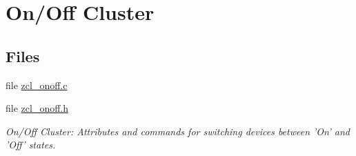 \hypertarget{group__zcl__onoff}{\section{On/\-Off Cluster}
\label{group__zcl__onoff}
}
\subsection*{Files}
\begin{DoxyCompactItemize}
\item 
file \hyperlink{zcl__onoff_8c}{zcl\-\_\-onoff.\-c}
\item 
file \hyperlink{zcl__onoff_8h}{zcl\-\_\-onoff.\-h}
\begin{DoxyCompactList}\small\item\em On/\-Off Cluster\-: Attributes and commands for switching devices between 'On' and 'Off' states. \end{DoxyCompactList}\end{DoxyCompactItemize}
